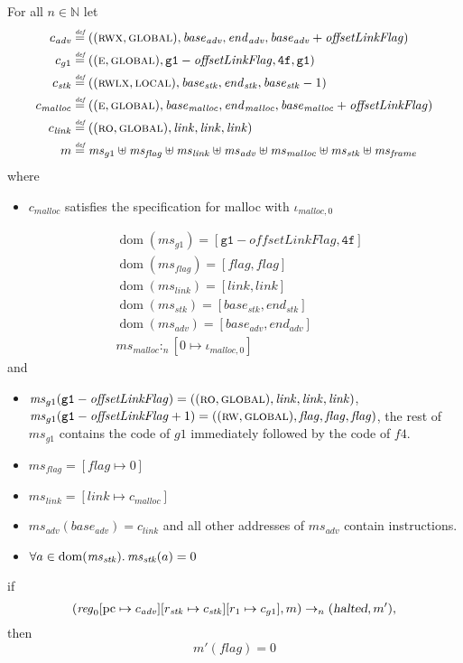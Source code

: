 \documentclass[a4paper]{article}
\newcommand{\update}[2]{[#1 \mapsto #2]}
\newcommand{\defeq}{\stackrel{\textit{\tiny{def}}}{=}}
\DeclareMathOperator{\dom}{dom}
\newcommand{\var}[1]{\mathit{#1}}
\newcommand{\hs}{\var{ms}}
\newcommand{\ms}{\hs}
\newcommand{\pcreg}{\mathrm{pc}}
\newcommand{\start}{\var{base}}
\newcommand{\addrend}{\var{end}}
\newcommand{\reg}{\var{reg}}
\newcommand{\heap}{\var{mem}}
\newcommand{\adv}{\var{adv}}
\newcommand{\link}{\var{link}}
\newcommand{\stk}{\var{stk}}
\newcommand{\flag}{\var{flag}}
\newcommand{\pwl}{\var{pwl}}
\newcommand{\olf}{\var{offsetLinkFlag}}
\newcommand{\halted}{\textsl{halted}}
\newcommand{\heapSat}[3][\heap]{#1 :_{#2} #3}
\newcommand{\memSat}[3][n]{\heapSat[#2]{#1}{#3}}
\newcommand{\codelabel}[1]{\mathit{#1}}
\newcommand{\malloc}{\codelabel{malloc}}
\newcommand{\nats}{\mathbb{N}}
\newcommand{\plainperm}[1]{\textsc{#1}}
\newcommand{\readonly}{\plainperm{ro}}
\newcommand{\readwrite}{\plainperm{rw}}
\newcommand{\entry}{\plainperm{e}}
\newcommand{\rwx}{\plainperm{rwx}}
\newcommand{\rwlx}{\plainperm{rwlx}}
\newcommand{\local}{\plainperm{local}}
\newcommand{\glob}{\plainperm{global}}
\newcommand{\step}[1][]{\rightarrow_{#1}}
\begin{document}
\begin{lemma}[Correctness of $g1$]
  \label{lem:correctness-g1}
  For all $n \in \nats$
  let
  \begin{align*}
    c_{\var{adv}} & \defeq ((\rwx,\glob),\start_{\adv},\addrend_{\adv},\start_{\adv}+\olf) \\
    c_{g1} & \defeq ((\entry,\glob),\mathtt{g1}-\olf,\mathtt{4f},\mathtt{g1}) \\
    c_\stk & \defeq ((\rwlx,\local),\start_\stk,\addrend_\stk,\start_\stk-1) \\
    c_\malloc & \defeq ((\entry,\glob),\start_\malloc,\addrend_\malloc,\start_\malloc+\olf) \\
    c_\link & \defeq ((\readonly,\glob),\link,\link,\link) \\
    m & \defeq \hs_{g1} \uplus 
        \ms_\flag \uplus                
        \ms_\link \uplus 
        \ms_\adv \uplus 
        \ms_\malloc \uplus 
        \ms_\stk \uplus
        \ms_{\var{frame}} 
  \end{align*}
  where 
  \begin{itemize}
  \item $c_\malloc$ satisfies the specification for malloc with $\iota_{\malloc,0}$
  \end{itemize}
  \begin{align*}
    &\dom(\hs_{g1}) = [\mathtt{g1}-\olf,\mathtt{4f}] \\
    &\dom(\hs_\flag) = [\flag,\flag] \\
    &\dom(\ms_\link) = [\link,\link]\\
    &\dom(\ms_\stk) = [\start_\stk, \addrend_\stk]\\
    &\dom(\hs_{\adv}) = [\start_\adv,\addrend_\adv] \\
    &\heapSat[\hs_{\malloc}]{n}{[0 \mapsto \iota_{\malloc,0}]}
  \end{align*}
  and
  \begin{itemize}
  \item $\ms_{g1}(\mathtt{g1}-\olf) = ((\readonly,\glob),\link,\link,\link)$, $\ms_{g1}(\mathtt{g1}-\olf+1) = ((\readwrite,\glob),\flag,\flag,\flag)$, the rest of $\hs_{g1}$ contains the code of $g1$ immediately followed by the code of $f4$.
  \item $\ms_\flag = [\flag \mapsto 0]$
  \item $\ms_{\var{link}} = [\link \mapsto c_\malloc]$
  \item $\hs_\adv(\start_\adv) = c_\link$ and all other addresses of $\ms_\adv$ contain instructions.
  \item $\forall a \in \dom(\ms_\stk) \ldotp \ms_\stk(a) = 0$ %
  \end{itemize}
  if 
  \[
    (\reg_0\update{\pcreg}{c_\adv}\update{r_\stk}{c_\stk}\update{r_1}{c_{g1}},m) \step[n] (\halted,m'),
  \]
  then
  \[
    m'(\flag) = 0
  \]  
\end{lemma}
\end{document}
